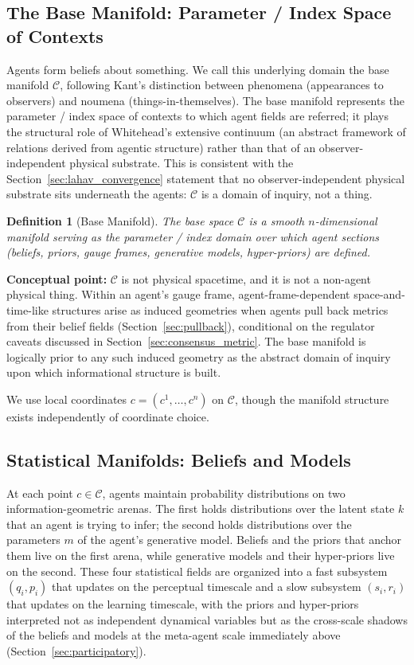 \documentclass[11pt]{article}
\newtheorem{definition}{Definition}
\begin{document}
\subsection{The Base Manifold: Parameter / Index Space of Contexts}

Agents form beliefs about something. We call this underlying domain the base manifold $\mathcal{C}$, following Kant's distinction between phenomena (appearances to observers) and noumena (things-in-themselves). The base manifold represents the parameter / index space of contexts to which agent fields are referred; it plays the structural role of Whitehead's extensive continuum (an abstract framework of relations derived from agentic structure) rather than that of an observer-independent physical substrate. This is consistent with the Section~\ref{sec:lahav_convergence} statement that no observer-independent physical substrate sits underneath the agents: $\mathcal{C}$ is a domain of inquiry, not a thing.

\begin{definition}[Base Manifold]
The base space $\mathcal{C}$ is a smooth $n$-dimensional manifold serving as the parameter / index domain over which agent sections (beliefs, priors, gauge frames, generative models, hyper-priors) are defined.
\end{definition}

\textbf{Conceptual point:} $\mathcal{C}$ is not physical spacetime, and it is not a non-agent physical thing. Within an agent's gauge frame, agent-frame-dependent space-and-time-like structures arise as induced geometries when agents pull back metrics from their belief fields (Section~\ref{sec:pullback}), conditional on the regulator caveats discussed in Section~\ref{sec:consensus_metric}. The base manifold is logically prior to any such induced geometry as the abstract domain of inquiry upon which informational structure is built.

We use local coordinates $c = (c^1, \ldots, c^n)$ on $\mathcal{C}$, though the manifold structure exists independently of coordinate choice.

\subsection{Statistical Manifolds: Beliefs and Models}
\label{sec:statistical_manifolds}

At each point $c \in \mathcal{C}$, agents maintain probability distributions on two information-geometric arenas. The first holds distributions over the latent state $k$ that an agent is trying to infer; the second holds distributions over the parameters $m$ of the agent's generative model. Beliefs and the priors that anchor them live on the first arena, while generative models and their hyper-priors live on the second. These four statistical fields are organized into a fast subsystem $(q_i, p_i)$ that updates on the perceptual timescale and a slow subsystem $(s_i, r_i)$ that updates on the learning timescale, with the priors and hyper-priors interpreted not as independent dynamical variables but as the cross-scale shadows of the beliefs and models at the meta-agent scale immediately above (Section~\ref{sec:participatory}).
\end{document}
